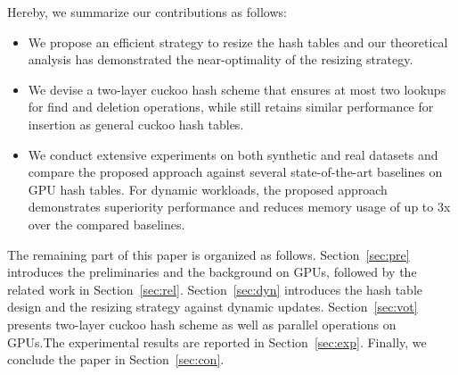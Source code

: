 
Hereby, we summarize our contributions as follows:
\begin{itemize}
	\item We propose an efficient strategy to resize the hash tables and our theoretical analysis has demonstrated the near-optimality of the resizing strategy.
	\item We devise a two-layer cuckoo hash scheme that ensures at most two lookups for find and deletion operations, while still retains similar performance for insertion as general cuckoo hash tables. 
	\item We conduct extensive experiments on both synthetic and real datasets and compare the proposed approach against several state-of-the-art baselines on GPU hash tables. For dynamic workloads, the proposed approach demonstrates superiority performance and reduces memory usage of up to 3x over the compared baselines.
\end{itemize}

The remaining part of this paper is organized as follows. Section~\ref{sec:pre} introduces the preliminaries and the background on GPUs, followed by the related work in Section~\ref{sec:rel}. Section~\ref{sec:dyn} introduces the hash table design and the resizing strategy against dynamic updates.
Section~\ref{sec:vot} presents two-layer cuckoo hash scheme as well as parallel operations on GPUs.The experimental results are reported in Section~\ref{sec:exp}. Finally, we conclude the paper in Section~\ref{sec:con}.